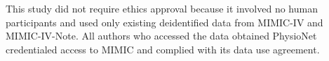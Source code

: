 \documentclass[unnumsec,webpdf,contemporary,large]{oup-authoring-template}
\begin{document}
This study did not require ethics approval because it involved no human participants and used only existing deidentified data from MIMIC-IV and MIMIC-IV-Note. All authors who accessed the data obtained PhysioNet credentialed access to MIMIC and complied with its data use agreement.










\end{document}
